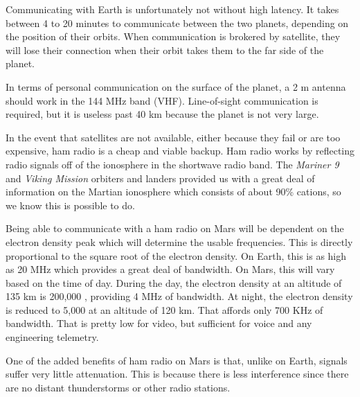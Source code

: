 

Communicating with Earth is unfortunately not without high latency. It takes between 4 to 20 minutes to communicate between the two planets, depending on the position of their orbits. When communication is brokered by satellite, they will lose their connection when their orbit takes them to the far side of the planet.

In terms of personal communication on the surface of the planet, a 2 m antenna should work in the 144 MHz band (VHF). Line-of-sight communication is required, but it is useless past 40 km because the planet is not very large.

In the event that satellites are not available, either because they fail or are too expensive, ham radio is a cheap and viable backup. Ham radio works by reflecting radio signals off of the ionosphere in the shortwave radio band. The {\it Mariner 9} and {\it Viking Mission} orbiters and landers provided us with a great deal of information on the Martian ionosphere which consists of about 90\%  cations, so we know this is possible to do.

Being able to communicate with a ham radio on Mars will be dependent on the electron density peak which will determine the usable frequencies. This is directly proportional to the square root of the electron density. On Earth, this is as high as 20 MHz which provides a great deal of bandwidth. On Mars, this will vary based on the time of day. During the day, the electron density at an altitude of 135 km is 200,000 , providing 4 MHz of bandwidth. At night, the electron density is reduced to 5,000  at an altitude of 120 km. That affords only 700 KHz of bandwidth. That is pretty low for video, but sufficient for voice and any engineering telemetry.

One of the added benefits of ham radio on Mars is that, unlike on Earth, signals suffer very little attenuation. This is because there is less interference since there are no distant thunderstorms or other radio stations.

